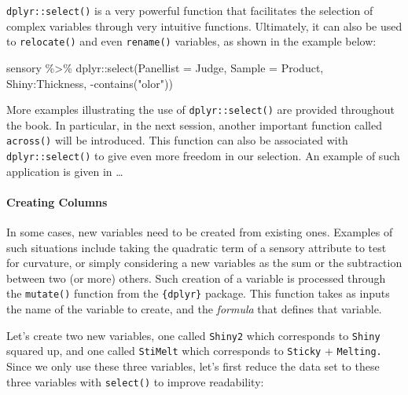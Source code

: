 \documentclass[
]{krantz}
\makeatletter
\newenvironment{Shaded}{\begin{snugshade}}{\end{snugshade}}
\newcommand{\AttributeTok}[1]{\textcolor[rgb]{0.61,0.61,0.61}{#1}}
\newcommand{\FunctionTok}[1]{\textcolor[rgb]{0,0,0}{#1}}
\newcommand{\NormalTok}[1]{#1}
\newcommand{\SpecialCharTok}[1]{\textcolor[rgb]{0,0,0}{#1}}
\newcommand{\StringTok}[1]{\textcolor[rgb]{0.5,0.5,0.5}{#1}}
\newenvironment{kframe}{%
\medskip{}
\setlength{\fboxsep}{.8em}
 \def\at@end@of@kframe{}%
 \ifinner\ifhmode%
  \def\at@end@of@kframe{\end{minipage}}%
  \begin{minipage}{\columnwidth}%
 \fi\fi%
 \def\FrameCommand##1{\hskip\@totalleftmargin \hskip-\fboxsep
 \colorbox{shadecolor}{##1}\hskip-\fboxsep
     \hskip-\linewidth \hskip-\@totalleftmargin \hskip\columnwidth}%
 \MakeFramed {\advance\hsize-\width
   \@totalleftmargin\z@ \linewidth\hsize
   \@setminipage}}%
 {\par\unskip\endMakeFramed%
 \at@end@of@kframe}
\renewenvironment{Shaded}{\begin{kframe}}{\end{kframe}}
\makeatother
\begin{document}
\texttt{dplyr::select()} is a very powerful function that facilitates the selection of complex variables through very intuitive functions. Ultimately, it can also be used to \texttt{relocate()} and even \texttt{rename()} variables, as shown in the example below:

\begin{Shaded}
\begin{Highlighting}[]
\NormalTok{sensory }\SpecialCharTok{\%\textgreater{}\%}
\NormalTok{  dplyr}\SpecialCharTok{::}\FunctionTok{select}\NormalTok{(}\AttributeTok{Panellist =}\NormalTok{ Judge, }\AttributeTok{Sample =}\NormalTok{ Product, }
\NormalTok{                Shiny}\SpecialCharTok{:}\NormalTok{Thickness, }\SpecialCharTok{{-}}\FunctionTok{contains}\NormalTok{(}\StringTok{"olor"}\NormalTok{))}
\end{Highlighting}
\end{Shaded}

More examples illustrating the use of \texttt{dplyr::select()} are provided throughout the book. In particular, in the next session, another important function called \texttt{across()} will be introduced. This function can also be associated with \texttt{dplyr::select()} to give even more freedom in our selection. An example of such application is given in \ldots{}

\hypertarget{creating-columns}{%
\paragraph*{Creating Columns}\label{creating-columns}}

In some cases, new variables need to be created from existing ones. Examples of such situations include taking the quadratic term of a sensory attribute to test for curvature, or simply considering a new variables as the sum or the subtraction between two (or more) others. Such creation of a variable is processed through the \texttt{mutate()} function from the \texttt{\{dplyr\}} package. This function takes as inputs the name of the variable to create, and the \emph{formula} that defines that variable.

Let's create two new variables, one called \texttt{Shiny2} which corresponds to \texttt{Shiny} squared up, and one called \texttt{StiMelt} which corresponds to \texttt{Sticky} + \texttt{Melting.} Since we only use these three variables, let's first reduce the data set to these three variables with \texttt{select()} to improve readability:
\end{document}
